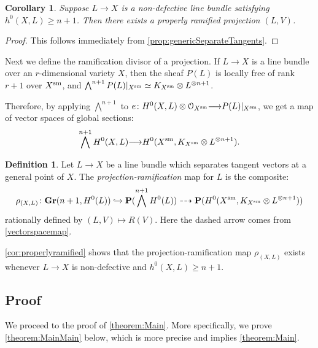 \documentclass[11pt,reqno]{amsart}
\theoremstyle{plain}
\newtheorem{corollary}[theorem]{Corollary}
\theoremstyle{definition}
\newtheorem{definition}[theorem]{Definition}
\theoremstyle{remark}
\numberwithin{equation}{section}
\newcommand{\cO}{{\mathcal O}}
\renewcommand{\to}{{\longrightarrow}}
\numberwithin{equation}{section}
\begin{document}
\begin{corollary}\label{cor:properlyramified}
  Suppose $L \to X$ is a non-defective line bundle  satisfying $h^{0}(X,L) \geq n+1$. Then there exists a properly ramified projection $(L,V)$.
\end{corollary}

\begin{proof}
  This follows immediately from \autoref{prop:genericSeparateTangents}.
\end{proof}

Next we define the ramification divisor of a projection.  If $L \to X$ is a line bundle over an $r$-dimensional variety $X$, then the sheaf $P(L)$ is locally free of rank $r+1$ over $X^{\rm sm}$, and $\bigwedge^{n+1}P(L)|_{X^{\rm sm}} \simeq K_{X^{\rm sm}} \otimes L^{\otimes n+1}$.  

Therefore, by applying $\bigwedge^{n+1}$ to $e \from H^{0}(X,L) \otimes \cO_{X^{\rm sm}} \to P(L)|_{X^{\rm sm}}$, we get a map of vector spaces of global sections: 
\begin{align}\label{vectorspacemap}
\bigwedge^{n+1}H^{0}(X,L) \to H^{0}(X^{\rm sm},K_{X^{\rm sm}} \otimes L^{\otimes n+1}).
\end{align}



\begin{definition}
  \label{def:ProjectionRamification}
  Let $L \to X$ be a line bundle which separates tangent vectors at a general point of $X$. The {\sl projection-ramification} map for $L$ is the composite: 
  \begin{align*}
    \rho_{(X,L)}{\colon} {\bf Gr}(n+1,H^{0}(L)) \hookrightarrow {\bf P}(\bigwedge^{n+1}H^{0}(L)) \dashrightarrow {\bf P}(H^{0}(X^{\rm sm}, K_{X^{\rm sm}} \otimes L^{\otimes n+1}))
  \end{align*}
  rationally defined by $(L,V) \mapsto R(V)$. Here the dashed arrow comes from \ref{vectorspacemap}.
\end{definition}

\autoref{cor:properlyramified} shows that the projection-ramification map $\rho_{(X,L)}$ exists whenever $L \to X$ is non-defective and $h^{0}(X,L) \geq n+1$. 


\subsection{Proof}
We proceed to the proof of \autoref{theorem:Main}. More specifically, we prove \autoref{theorem:MainMain} below, which is more precise and implies \autoref{theorem:Main}.
\end{document}
